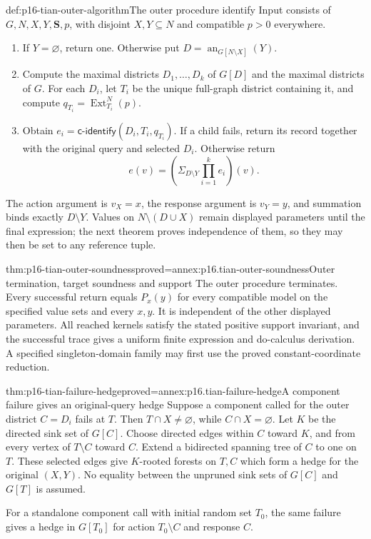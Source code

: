 \begin{hbmethod}{def:p16-tian-outer-algorithm}{The outer procedure identify}
Input consists of \(G,N,X,Y,\mathbf S,p\), with disjoint
\(X,Y\subseteq N\) and compatible \(p>0\) everywhere.
\begin{enumerate}
\item If \(Y=\varnothing\), return one. Otherwise put
      \(D=\operatorname{an}_{G[N\setminus X]}(Y)\).
\item Compute the maximal districts \(D_1,\ldots,D_k\) of
      \(G[D]\) and the maximal districts of \(G\). For each
      \(D_i\), let \(T_i\) be the unique full-graph district
      containing it, and compute
      \(q_{T_i}=\operatorname{Ext}^N_{T_i}(p)\).
\item Obtain \(e_i=\mathsf{c\mbox{-}identify}(D_i,T_i,q_{T_i})\).
      If a child fails, return its record together with the original
      query and selected \(D_i\). Otherwise return
      \[
       e(v)=\left(\Sigma_{D\setminus Y}\prod_{i=1}^k e_i\right)(v).
      \]
\end{enumerate}
The action argument is \(v_X=x\), the response argument is
\(v_Y=y\), and summation binds exactly \(D\setminus Y\).
Values on \(N\setminus(D\cup X)\) remain displayed parameters
until the final expression; the next theorem proves independence
of them, so they may then be set to any reference tuple.
\end{hbmethod}

\begin{hbtheorem}{thm:p16-tian-outer-soundness}{proved=annex:p16.tian-outer-soundness}{Outer termination, target soundness and support}
The outer procedure terminates. Every successful return equals
\(P_x(y)\) for every compatible model on the specified value sets
and every \(x,y\). It is independent of the other displayed
parameters. All reached kernels satisfy the stated positive support
invariant, and the successful trace gives a uniform finite expression
and do-calculus derivation. A specified singleton-domain family may
first use the proved constant-coordinate reduction.
\end{hbtheorem}

\begin{hbtheorem}{thm:p16-tian-failure-hedge}{proved=annex:p16.tian-failure-hedge}{A component failure gives an original-query hedge}
Suppose a component called for the outer district \(C=D_i\)
fails at \(T\). Then \(T\cap X\ne\varnothing\), while
\(C\cap X=\varnothing\). Let \(K\) be the directed sink
set of \(G[C]\). Choose directed edges within \(C\) toward
\(K\), and from every vertex of \(T\setminus C\) toward
\(C\). Extend a bidirected spanning tree of \(C\) to one
on \(T\). These selected edges give \(K\)-rooted forests
on \(T,C\) which form a hedge for the original \((X,Y)\).
No equality between the unpruned sink sets of \(G[C]\) and
\(G[T]\) is assumed.

For a standalone component call with initial random set \(T_0\),
the same failure gives a hedge in \(G[T_0]\) for action
\(T_0\setminus C\) and response \(C\).
\end{hbtheorem}

